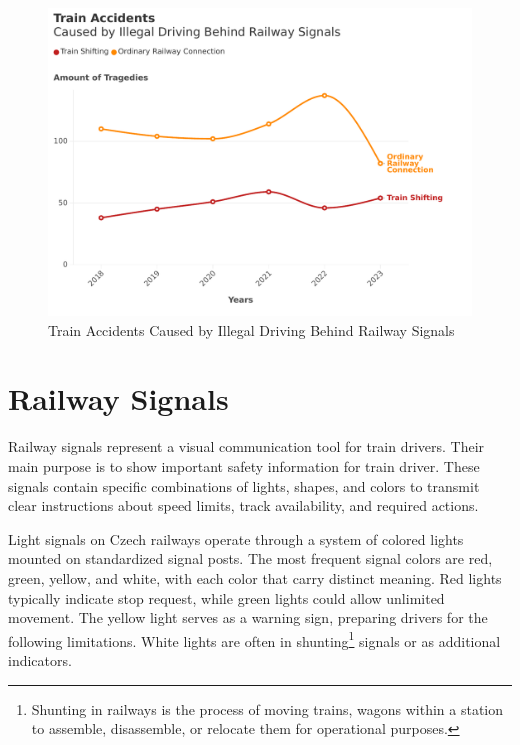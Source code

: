 \documentclass[english, ing, kiv, he, iso690alph, pdf, viewonly]{fasthesis}
\begin{document}
\begin{figure}[!ht]

    \includegraphics[width=1\linewidth]{Train Accidents.pdf}
    \caption{Train Accidents Caused by Illegal Driving Behind Railway Signals}
    \label{fig:enter-label}
\end{figure}


\section{Railway Signals}
Railway signals represent a visual communication tool for train drivers. Their main purpose is to show important safety information for train driver. These signals contain specific combinations of lights, shapes, and colors to transmit clear instructions about speed limits, track availability, and required actions. 

Light signals on Czech railways operate through a system of colored lights mounted on standardized signal posts. The most frequent signal colors are red, green, yellow, and white, with each color that carry distinct meaning. Red lights typically indicate stop request, while green lights could allow unlimited movement. The yellow light serves as a warning sign, preparing drivers for the following limitations. White lights are often in shunting\footnote{Shunting in railways is the process of moving trains, wagons within a station to assemble, disassemble, or relocate them for operational purposes.} signals or as additional indicators. 
\end{document}
